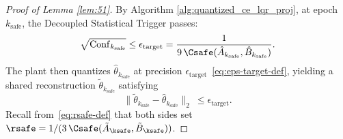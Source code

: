\documentclass[11pt,journal,onecolumn]{IEEEtran}
\newcommand{\safe}{\mathrm{safe}}
\begin{document}
\begin{proof}[Proof of Lemma \ref{lem:51}]

    By Algorithm \ref{alg:quantized_ce_lqr_proj}, at epoch $k_\safe$, the Decoupled Statistical Trigger passes:
    \begin{equation}
        \label{safecond}
        \sqrt{\mathrm{Conf}_{k_\safe}} \le \epsilon_{\mathrm{target}} = \frac{1}{9\,\Csafe(\hat A_{k_\safe},\hat B_{k_\safe})}.
    \end{equation}
    The plant then quantizes $\hat\theta_{k_\safe}$ at precision $\epsilon_{\mathrm{target}}$~\eqref{eq:eps-target-def}, yielding a shared reconstruction $\tilde\theta_{k_\safe}$ satisfying
    \begin{equation}\label{eq:quant-guarantee}
        \|\tilde\theta_{k_\safe} - \hat\theta_{k_\safe}\|_2 \ \le \epsilon_{\mathrm{target}}.
    \end{equation}
    Recall from~\eqref{eq:rsafe-def} that both sides set $\rsafe = 1/(3\,\Csafe(\tilde A_{\ksafe}, \tilde B_{\ksafe}))$.


\end{proof}
\end{document}
